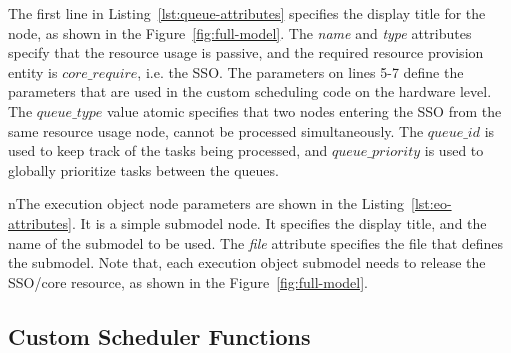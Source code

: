 

The first line in Listing~\ref{lst:queue-attributes} specifies the display title for the node, as shown in the Figure~\ref{fig:full-model}. The \emph{name} and \emph{type} attributes specify that the resource usage is passive, and the required resource provision entity is $core\_require$, i.e. the SSO. The parameters on lines 5-7 define the parameters that are used in the custom scheduling code on the hardware level. The \emph{$queue\_type$} value atomic specifies that two nodes entering the SSO from the same resource usage node, cannot be processed simultaneously. The \emph{$queue\_id$} is used to keep track of the tasks being processed, and \emph{$queue\_priority$} is used to globally prioritize tasks between the queues.



nThe execution object node parameters are shown in the Listing~\ref{lst:eo-attributes}. It is a simple submodel node. It specifies the display title, and the name of the submodel to be used. The \emph{file} attribute specifies the file that defines the submodel. Note that, each execution object submodel needs to release the SSO/core resource, as shown in the Figure~\ref{fig:full-model}.

\subsection{Custom Scheduler Functions}
\label{sec:custom-scheduler-functions}



